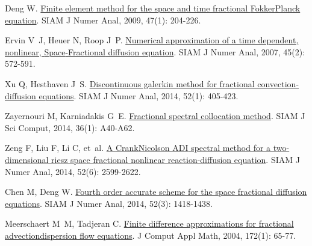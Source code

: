 \begin{thebibliography}{79}
    Deng W.
    \newblock \href{https://doi.org/10.1137/080714130}{Finite element method for the space and time fractional {{Fokker}}{\textendash}{{Planck}} equation}\allowbreak[J].
    \newblock SIAM J Numer Anal, 2009, 47\allowbreak (1): 204-226.
    
    Ervin V~J, Heuer N, Roop J~P.
    \newblock \href{https://doi.org/10.1137/050642757}{Numerical approximation of a time dependent, nonlinear, {{Space}}-{{Fractional}} diffusion equation}\allowbreak[J].
    \newblock SIAM J Numer Anal, 2007, 45\allowbreak (2): 572-591.
    
    Xu Q, Hesthaven J~S.
    \newblock \href{https://doi.org/10.1137/130918174}{Discontinuous galerkin method for fractional convection-diffusion equations}\allowbreak[J].
    \newblock SIAM J Numer Anal, 2014, 52\allowbreak (1): 405-423.
    
    Zayernouri M, Karniadakis G~E.
    \newblock \href{https://doi.org/10.1137/130933216}{Fractional spectral collocation method}\allowbreak[J].
    \newblock SIAM J Sci Comput, 2014, 36\allowbreak (1): A40-A62.
    
    Zeng F, Liu F, Li C, et~al.
    \newblock \href{https://doi.org/10.1137/130934192}{A {{Crank}}{\textendash}{{Nicolson ADI}} spectral method for a two-dimensional riesz space fractional nonlinear reaction-diffusion equation}\allowbreak[J].
    \newblock SIAM J Numer Anal, 2014, 52\allowbreak (6): 2599-2622.
    
    Chen M, Deng W.
    \newblock \href{https://doi.org/10.1137/130933447}{Fourth order accurate scheme for the space fractional diffusion equations}\allowbreak[J].
    \newblock SIAM J Numer Anal, 2014, 52\allowbreak (3): 1418-1438.
    
    Meerschaert M~M, Tadjeran C.
    \newblock \href{https://www.sciencedirect.com/science/article/pii/S0377042704000986}{Finite difference approximations for fractional advection{\textendash}dispersion flow equations}\allowbreak[J].
    \newblock J Comput Appl Math, 2004, 172\allowbreak (1): 65-77.
    

\end{thebibliography}
